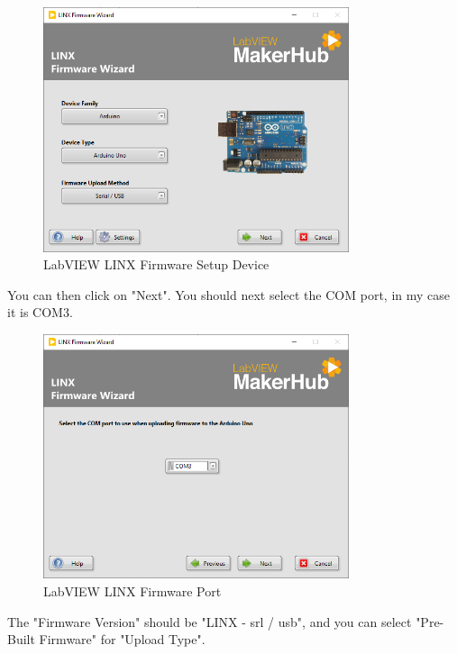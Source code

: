 \documentclass[a4paper,11pt]{report}
\begin{document}
\begin{figure}[H]
\centering
\includegraphics[width=0.8\textwidth]{screenshots/labviewarduino2}
\caption{LabVIEW LINX Firmware Setup Device}
\end{figure}

You can then click on "Next". You should next select the COM port, in my case it is COM3.
\begin{figure}[H]

\centering
\includegraphics[width=0.8\textwidth]{screenshots/labviewarduino3}
\caption{LabVIEW LINX Firmware Port}
\end{figure}

The "Firmware Version" should be "LINX - \gls{srl} / \gls{usb}", and you can select "Pre-Built Firmware" for "Upload Type".
\end{document}
